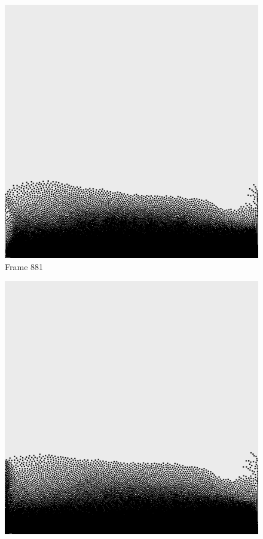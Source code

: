 \documentclass[a4paper, 12pt, oneside]{book}
\begin{document}
\begin{figure}[!ht]
    \addvspace{0.5ex}
        \begin{center}
            \includegraphics[width=\linewidth]{images/test_case_2/881.png}
            Frame 881
        \end{center}
    \endminipage
    \hfill
        \begin{center}
            \includegraphics[width=\linewidth]{images/test_case_2/901.png}

\end{center}
\end{figure}
\end{document}
